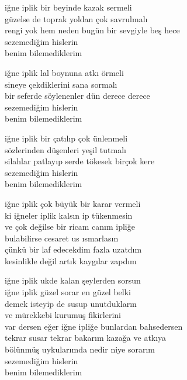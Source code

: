 \documentclass[10pt, openright, oneside]{memoir}
\theoremstyle{definition}
\begin{document}
\begin{cverse}
  iğne iplik bir beyinde kazak sermeli \\
  güzelse de toprak yoldan çok savrulmalı \\
  rengi yok hem neden bugün bir sevgiyle beş hece \\
  sezemediğim hislerin \\
  benim bilemediklerim

  iğne iplik lal boynuna atkı örmeli \\
  sineye çekdiklerini sana sormalı \\
  bir seferde söylenenler dün derece derece \\
  sezemediğim hislerin \\
  benim bilemediklerim

  iğne iplik bir çatılıp çok ünlenmeli \\
  sözlerinden düşenleri yeşil tutmalı \\
  silahlar patlayıp serde tökesek birçok kere \\
  sezemediğim hislerin \\
  benim bilemediklerim

  iğne iplik çok büyük bir karar vermeli \\
  ki iğneler iplik kalsın ip tükenmesin \\
  ve çok değilse bir ricam canım ipliğe \\
  bulabilirse cesaret us ısmarlasın \\
  çünkü bir laf edecekdim fazla uzatdım \\
  kesinlikle değil artık kaygılar zapdım

  iğne iplik ukde kalan şeylerden sorsun \\
  iğne iplik güzel sorar en güzel belki \\
  demek isteyip de susup unutdukların \\
  ve mürekkebi kurumuş fikirlerini \\
  var dersen eğer iğne ipliğe bunlardan bahsedersen \\
  tekrar susar tekrar bakarım kazağa ve atkıya \\
  bölünmüş uykularımda nedir niye sorarım \\
  sezemediğim hislerin \\
  benim bilemediklerim \\
\end{cverse}
\vspace*{\fill}
%
\newpage
{}
\vspace*{\fill}
\end{document}
